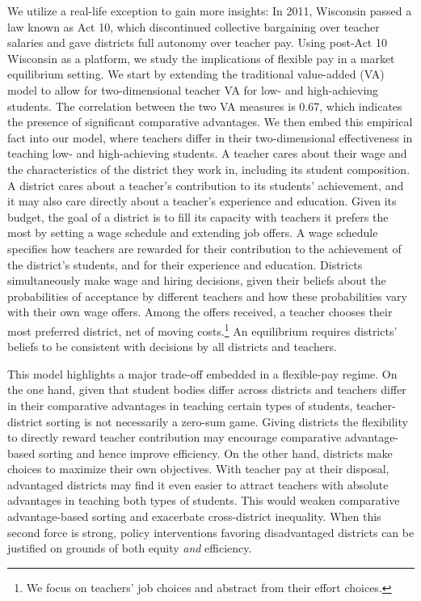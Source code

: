 \documentclass[notitlepage,12pt]{article}%
\begin{document}
We utilize a real-life exception to gain more insights: In 2011, Wisconsin
passed a law known as Act 10, which discontinued collective bargaining over
teacher salaries and gave districts full autonomy over teacher pay. Using
post-Act 10 Wisconsin as a platform, we study the implications of flexible pay
in a market equilibrium setting. We start by extending the traditional
value-added (VA) model to allow for two-dimensional teacher VA for low- and
high-achieving students. The correlation between the two VA measures is 0.67,
which indicates the presence of significant comparative advantages. We then
embed this empirical fact into our model, where teachers differ in their
two-dimensional effectiveness in teaching low- and high-achieving students. A
teacher cares about their wage and the characteristics of the district they
work in, including its student composition. A district cares about a teacher's
contribution to its students' achievement, and it may also care directly about
a teacher's experience and education. Given its budget, the goal of a district
is to fill its capacity with teachers it prefers the most by setting a wage
schedule and extending job offers. A wage schedule specifies how teachers are
rewarded for their contribution to the achievement of the district's students,
and for their experience and education. Districts simultaneously make wage and
hiring decisions, given their beliefs about the probabilities of acceptance by
different teachers and how these probabilities vary with their own wage
offers. Among the offers received, a teacher chooses their most preferred
district, net of moving costs.\footnote{We focus on teachers' job choices and
abstract from their effort choices.} An equilibrium requires
districts' beliefs to be consistent with decisions by all districts and teachers.

This model highlights a major trade-off embedded in a flexible-pay regime. On
the one hand, given that student bodies differ across districts and teachers
differ in their comparative advantages in teaching certain types of students,
teacher-district sorting is not necessarily a zero-sum game. Giving districts
the flexibility to directly reward teacher contribution may encourage
comparative advantage-based sorting and hence improve efficiency. On the other
hand, districts make choices to maximize their own objectives. With teacher
pay at their disposal, advantaged districts may find it even easier to attract
teachers with absolute advantages in teaching both types of students. This
would weaken comparative advantage-based sorting and exacerbate cross-district
inequality. When this second force is strong, policy interventions favoring
disadvantaged districts can be justified on grounds of both equity \emph{and }efficiency.
\end{document}
